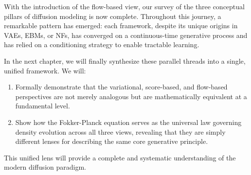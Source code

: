 With the introduction of the flow-based view, our survey of the three conceptual pillars of diffusion modeling is now complete. Throughout this journey, a remarkable pattern has emerged: each framework, despite its unique origins in VAEs, EBMs, or NFs, has converged on a continuous-time generative process and has relied on a conditioning strategy to enable tractable learning.

In the next chapter, we will finally synthesize these parallel threads into a single, unified framework. We will:
\begin{enumerate}
    \item Formally demonstrate that the variational, score-based, and flow-based perspectives are not merely analogous but are mathematically equivalent at a fundamental level.
    \item Show how the Fokker-Planck equation serves as the universal law governing density evolution across all three views, revealing that they are simply different lenses for describing the same core generative principle.
\end{enumerate}

This unified lens will provide a complete and systematic understanding of the modern diffusion paradigm. 




